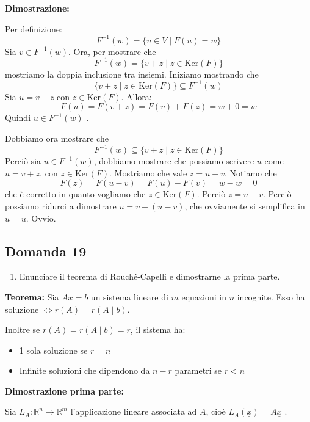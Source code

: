 \documentclass[
  a4paper,
]{article}
\providecommand{\tightlist}{%
  \setlength{\itemsep}{0pt}\setlength{\parskip}{0pt}}
\providecommand{\tightlist}{}
\begin{document}
\textbf{Dimostrazione:}

Per definizione: \[
F^{-1}(w) = \{u \in V \mid F(u) = w\}
\] Sia \(v \in F^{-1}(w)\). Ora, per mostrare che \[
F^{-1}(w) = \{v + z \mid z \in \text{Ker}(F) \}
\] mostriamo la doppia inclusione tra insiemi. Iniziamo mostrando che \[
\{v + z \mid z \in \text{Ker}(F) \} \subseteq F^{-1}(w) 
\] Sia \(u = v + z\) con \(z \in \text{Ker}(F)\). Allora: \[
F(u) = F(v + z) = F(v) + F(z) = w + 0 = w
\] Quindi \(u \in F^{-1}(w)\) .

Dobbiamo ora mostrare che \[
F^{-1}(w) \subseteq \{v + z \mid z \in \text{Ker}(F) \}
\] Perciò sia \(u \in F^{-1}(w)\), dobbiamo mostrare che possiamo
scrivere \(u\) come \(u = v + z\), con \(z \in \text{Ker}(F)\).
Mostriamo che vale \(z = u - v\). Notiamo che \[
F(z) = F(u - v) = F(u) - F(v) = w - w = \underline{0}
\] che è corretto in quanto vogliamo che \(z \in \text{Ker}(F)\). Perciò
\(z = u - v\). Perciò possiamo ridurci a dimostrare \(u = v + (u - v)\),
che ovviamente si semplifica in \(u = u\). Ovvio.

\hypertarget{domanda-19}{%
\subsection{Domanda 19}\label{domanda-19}}

\begin{observationbox}[Domanda]
\begin{enumerate}
\def\labelenumi{\arabic{enumi}.}
\setcounter{enumi}{18}
\tightlist
\item
  Enunciare il teorema di Rouché-Capelli e dimostrarne la prima parte.
\end{enumerate}
\end{observationbox}

\textbf{Teorema:} Sia \(A\underline{x} = \underline{b}\) un sistema
lineare di \(m\) equazioni in \(n\) incognite. Esso ha soluzione
\(\iff r(A) = r(A \mid b)\).

Inoltre se \(r(A) = r(A \mid b) = r\), il sistema ha:

\begin{itemize}
\tightlist
\item
  1 sola soluzione se \(r=n\)
\item
  Infinite soluzioni che dipendono da \(n-r\) parametri se \(r < n\)
\end{itemize}

\textbf{Dimostrazione prima parte:}

Sia \(L_A : \mathbb{R}^n \to \mathbb{R}^m\) l'applicazione lineare
associata ad \(A\), cioè \(L_A(\underline{x}) = A \underline{x}\) .
\end{document}
